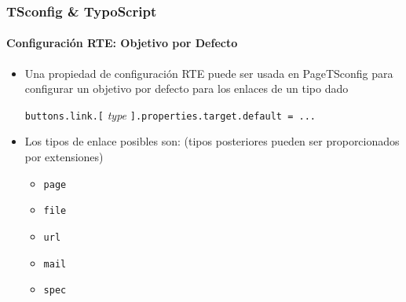 \begin{frame}[fragile]
	\frametitle{TSconfig \& TypoScript}
	\framesubtitle{Configuración RTE: Objetivo por Defecto}

	\begin{itemize}

		\item Una propiedad de configuración RTE puede ser usada en PageTSconfig
			para configurar un objetivo por defecto para los enlaces de un tipo dado\newline

			\small
				\texttt{buttons.link.[}
				\textit{type}
				\texttt{].properties.target.default = ...}
			\normalsize\newline

		\item Los tipos de enlace posibles son:\newline
			\small
				(tipos posteriores pueden ser proporcionados por extensiones)
			\normalsize

			\begin{itemize}
				\item \texttt{page}
				\item \texttt{file}
				\item \texttt{url}
				\item \texttt{mail}
				\item \texttt{spec}
			\end{itemize}
	\end{itemize}

\end{frame}

